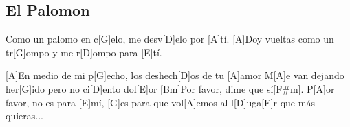 \subsection*{El Palomon   }
\begin{guitar}
[A]Como un palomo en c[G]elo, me desv[D]elo por [A]tí.
[A]Doy vueltas como un tr[G]ompo y me r[D]ompo para [E]tí.

[A]En medio de mi p[G]echo, los deshech[D]os de tu [A]amor
M[A]e van dejando her[G]ido pero no ci[D]ento dol[E]or
[Bm]Por favor, dime que sí[F#m].
P[A]or favor, no es para [E]mí,
[G]es para que vol[A]emos al l[D]uga[E]r que más quieras...
\end{guitar}
